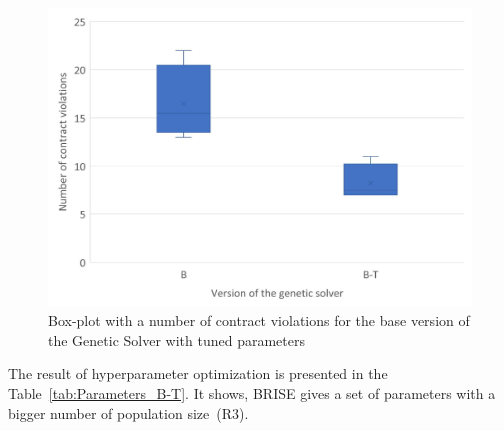 \begin{table}
	\centering
	\caption{Parameters of B and B-T versions of the Genetic Solver}\label{tab:Parameters_B-T}
\end{table}

\begin{figure}
	\centering
	\includegraphics[width=\textwidth]{images/BoxPlotSolverBasicTuning}
	\caption[Box-plot with a number of contract violations for the base version of the Genetic Solver with tuned parameters]{Box-plot with a number of contract violations for the base version of the Genetic Solver with tuned parameters}
	\label{fig:boxplotsolverbasictuning}
\end{figure}

The result of hyperparameter optimization is presented in the Table~\ref{tab:Parameters_B-T}. It shows, BRISE gives a set of parameters with a bigger number of population size~(R3).

